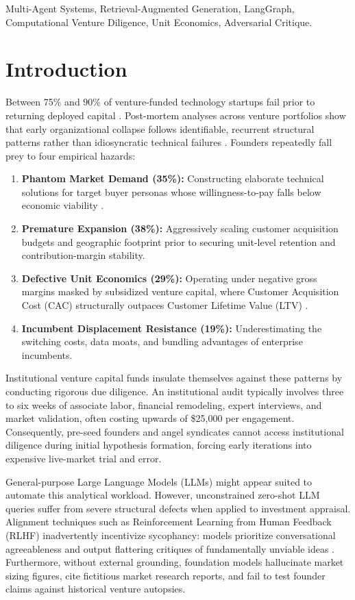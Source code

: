 \documentclass[conference]{IEEEtran}
\begin{document}
\begin{IEEEkeywords}
Multi-Agent Systems, Retrieval-Augmented Generation, LangGraph, Computational Venture Diligence, Unit Economics, Adversarial Critique.
\end{IEEEkeywords}

\section{Introduction}

Between 75\% and 90\% of venture-funded technology startups fail prior to returning deployed capital \cite{blank2013}. Post-mortem analyses across venture portfolios show that early organizational collapse follows identifiable, recurrent structural patterns rather than idiosyncratic technical failures \cite{cbinsights2021}. Founders repeatedly fall prey to four empirical hazards:
\begin{enumerate}
    \item \textbf{Phantom Market Demand (35\%):} Constructing elaborate technical solutions for target buyer personas whose willingness-to-pay falls below economic viability \cite{ries2011}.
    \item \textbf{Premature Expansion (38\%):} Aggressively scaling customer acquisition budgets and geographic footprint prior to securing unit-level retention and contribution-margin stability.
    \item \textbf{Defective Unit Economics (29\%):} Operating under negative gross margins masked by subsidized venture capital, where Customer Acquisition Cost (CAC) structurally outpaces Customer Lifetime Value (LTV) \cite{skok2016}.
    \item \textbf{Incumbent Displacement Resistance (19\%):} Underestimating the switching costs, data moats, and bundling advantages of enterprise incumbents.
\end{enumerate}

Institutional venture capital funds insulate themselves against these patterns by conducting rigorous due diligence. An institutional audit typically involves three to six weeks of associate labor, financial remodeling, expert interviews, and market validation, often costing upwards of \$25,000 per engagement. Consequently, pre-seed founders and angel syndicates cannot access institutional diligence during initial hypothesis formation, forcing early iterations into expensive live-market trial and error.

General-purpose Large Language Models (LLMs) might appear suited to automate this analytical workload. However, unconstrained zero-shot LLM queries suffer from severe structural defects when applied to investment appraisal. Alignment techniques such as Reinforcement Learning from Human Feedback (RLHF) inadvertently incentivize sycophancy: models prioritize conversational agreeableness and output flattering critiques of fundamentally unviable ideas \cite{sharma2023, casper2023}. Furthermore, without external grounding, foundation models hallucinate market sizing figures, cite fictitious market research reports, and fail to test founder claims against historical venture autopsies.
\end{document}
